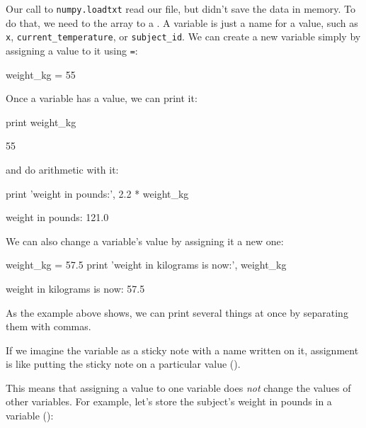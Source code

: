 \documentclass{book}
\begin{document}
Our call to \texttt{numpy.loadtxt} read our file, but didn't save the
data in memory. To do that, we need to 
the array to a . A variable is just a
name for a value, such as \texttt{x}, \texttt{current\_temperature}, or
\texttt{subject\_id}. We can create a new variable simply by assigning a
value to it using \texttt{=}:

\begin{VerbIn}
weight_kg = 55
\end{VerbIn}

Once a variable has a value, we can print it:

\begin{VerbIn}
print weight_kg
\end{VerbIn}

\begin{VerbOut}
55
\end{VerbOut}

and do arithmetic with it:

\begin{VerbIn}
print 'weight in pounds:', 2.2 * weight_kg
\end{VerbIn}

\begin{VerbOut}
weight in pounds: 121.0
\end{VerbOut}

We can also change a variable's value by assigning it a new one:

\begin{VerbIn}
weight_kg = 57.5
print 'weight in kilograms is now:', weight_kg
\end{VerbIn}

\begin{VerbOut}
weight in kilograms is now: 57.5
\end{VerbOut}

As the example above shows, we can print several things at once by
separating them with commas.

If we imagine the variable as a sticky note with a name written on it,
assignment is like putting the sticky note on a particular value ().


This means that assigning a value to one variable does \emph{not} change
the values of other variables. For example, let's store the subject's
weight in pounds in a variable ():
\end{document}
